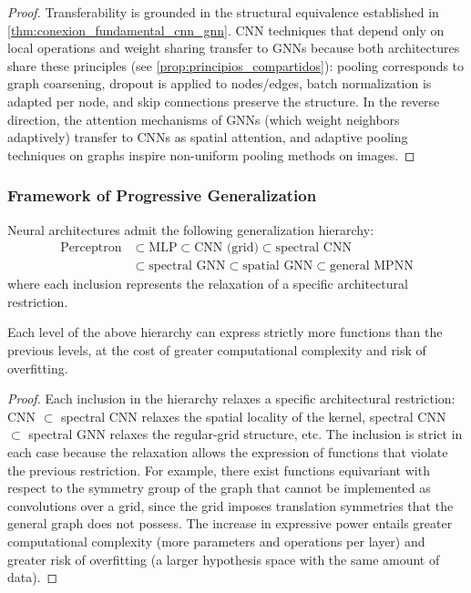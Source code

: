 \begin{proof}
Transferability is grounded in the structural equivalence established in \autoref{thm:conexion_fundamental_cnn_gnn}. CNN techniques that depend only on local operations and weight sharing transfer to GNNs because both architectures share these principles (see \autoref{prop:principios_compartidos}): pooling corresponds to graph coarsening, dropout is applied to nodes/edges, batch normalization is adapted per node, and skip connections preserve the structure. In the reverse direction, the attention mechanisms of GNNs (which weight neighbors adaptively) transfer to CNNs as spatial attention, and adaptive pooling techniques on graphs inspire non-uniform pooling methods on images.
\end{proof}

\subsubsection{Framework of Progressive Generalization}

\begin{theorem}\label{thm:jerarquia_generalizacion_cnn}
Neural architectures admit the following generalization hierarchy:
\begin{align}
\text{Perceptron} &\subset \text{MLP} \subset \text{CNN (grid)} \subset \text{spectral CNN} \nonumber \\
&\subset \text{spectral GNN} \subset \text{spatial GNN} \subset \text{general MPNN}
\end{align}
where each inclusion represents the relaxation of a specific architectural restriction.
\end{theorem}

\begin{corollary}\label{cor:poder_expresivo_creciente}
Each level of the above hierarchy can express strictly more functions than the previous levels, at the cost of greater computational complexity and risk of overfitting.
\end{corollary}

\begin{proof}
Each inclusion in the hierarchy relaxes a specific architectural restriction: CNN $\subset$ spectral CNN relaxes the spatial locality of the kernel, spectral CNN $\subset$ spectral GNN relaxes the regular-grid structure, etc. The inclusion is strict in each case because the relaxation allows the expression of functions that violate the previous restriction. For example, there exist functions equivariant with respect to the symmetry group of the graph that cannot be implemented as convolutions over a grid, since the grid imposes translation symmetries that the general graph does not possess. The increase in expressive power entails greater computational complexity (more parameters and operations per layer) and greater risk of overfitting (a larger hypothesis space with the same amount of data).
\end{proof}


